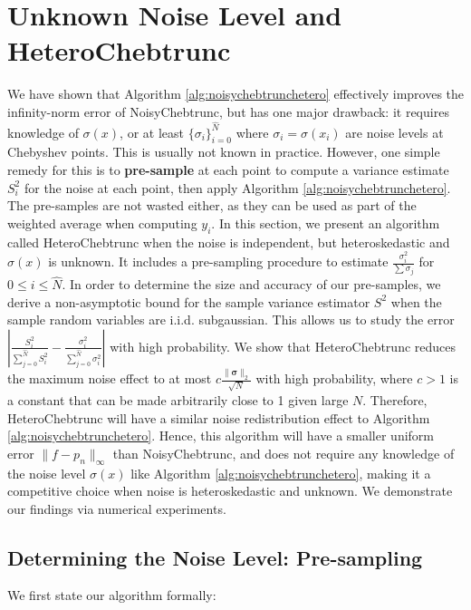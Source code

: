\documentclass[pdflatex,sn-mathphys-num]{sn-jnl}%
\theoremstyle{thmstyleone}%
\theoremstyle{thmstyletwo}%
\theoremstyle{thmstylethree}%
\begin{document}
\section{Unknown Noise Level and HeteroChebtrunc}\label{sec:noisy-unknown}

We have shown that Algorithm \ref{alg:noisychebtrunchetero} effectively improves the infinity-norm error of NoisyChebtrunc, but has one major drawback: it requires knowledge of $\sigma(x)$, or at least $ \{\sigma_i\}_{i=0}^{\hat{N}} $ where $\sigma_i = \sigma(x_i)$ are noise levels at Chebyshev points. This is usually not known in practice. However, one simple remedy for this is to \textbf{pre-sample} at each point to compute a variance estimate $S_i^2$ for the noise at each point, then apply Algorithm \ref{alg:noisychebtrunchetero}. The pre-samples are not wasted either, as they can be used as part of the weighted average when computing $y_i$. In this section, we present an algorithm called HeteroChebtrunc when the noise is independent, but heteroskedastic and $\sigma(x)$ is unknown. It includes a pre-sampling procedure to estimate $\frac{\sigma_i^2}{\sum \sigma_j}$ for $0\leq i\leq \hat{N}$. In order to determine the size and accuracy of our pre-samples, we derive a non-asymptotic bound for the sample variance estimator $S^2$ when the sample random variables are i.i.d. subgaussian. This allows us to study the error $ \left|\frac{S_i^2}{\sum_{j=0}^{\hat{N}}S_i^2} - \frac{\sigma_i^2}{\sum_{j=0}^{\hat{N}}\sigma_i^2}\right|$ with high probability. We show that HeteroChebtrunc reduces the maximum noise effect to at most $c\frac{\|\bm{\sigma}\|_2}{\sqrt{N}}$ with high probability, where $c>1$ is a constant that can be made arbitrarily close to 1 given large $N$. Therefore, HeteroChebtrunc will have a similar noise redistribution effect to Algorithm \ref{alg:noisychebtrunchetero}. Hence, this algorithm will have a smaller uniform error $\|f-p_n\|_\infty$ than NoisyChebtrunc, and does not require any knowledge of the noise level $\sigma(x)$ like Algorithm \ref{alg:noisychebtrunchetero}, making it a competitive choice when noise is heteroskedastic and unknown. We demonstrate our findings via numerical experiments. 



\subsection{Determining the Noise Level: Pre-sampling}


We first state our algorithm formally:
\end{document}
